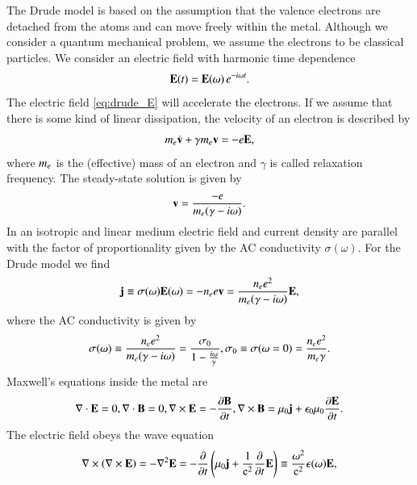 The Drude model is based on the assumption that the valence electrons are
detached from the atoms and can move freely within the metal. Although we
consider a quantum mechanical problem, we assume the electrons to be classical
particles. We consider an electric field with harmonic time dependence
\begin{equation}
\label{eq:drude_E}
\vec E(t) = \vec{E}(\omega) \, \e^{-\imag\omega t}.
\end{equation}
The electric field \eqref{eq:drude_E} will accelerate the electrons. If we
assume that there is some kind of linear dissipation, the velocity of an
electron is described by
\begin{equation}
\me\dot{\vec{v}} + \gamma \me \vec{v} = -\qe \vec E,
\end{equation}
where $\me$ is the (effective) mass of an electron and $\gamma$ is called
relaxation frequency. The steady-state solution is given by
\begin{equation}
\vec v = \frac{-\qe}{\me(\gamma-\imag\omega)}.
\end{equation}
In an isotropic and linear medium electric field and current density are parallel
with the factor of proportionality given by the AC conductivity $\sigma(\omega)$.
For the Drude model we find
\begin{equation}
\vec j \equiv \sigma(\omega) \vec E(\omega) = -\nee\qe \vec v = \frac{\nee \qe^2}{\me(\gamma-\imag\omega)} \vec E,
\end{equation}
where the AC conductivity is given by
\begin{equation}
\sigma(\omega) \equiv \frac{\nee\qe^2}{\me(\gamma-\imag\omega)} = \frac{\sigma_0}{1-\frac{\imag\omega}{\gamma}}, \\
\sigma_0 \equiv \sigma(\omega=0) = \frac{\nee\qe^2}{\me\gamma}.
\end{equation}
Maxwell's equations inside the metal are
\begin{equation}
\vec \nabla \cdot \vec E = 0, \\
\vec \nabla \cdot \vec B = 0, \\
\vec \nabla \times \vec E = -\frac{\partial\vec B}{\partial t}, \\
\vec \nabla \times \vec B = \mu_0 \vec j + \epsilon_0 \mu_0 \frac{\partial \vec E}{\partial t}.
\end{equation}
The electric field obeys the wave equation
\begin{equation}
\label{optical_drude_wave}
\vec\nabla \times \left(\nabla\times \vec E\right) = -\vec\nabla^2 \vec E = 
- \frac{\partial}{\partial t} \left(\mu_0 \vec j + \frac{1}{\c^2}\frac{\partial}{\partial t} \vec E\right) \equiv
\frac{\omega^2}{\c^2} \epsilon(\omega) \vec E,
\end{equation}
